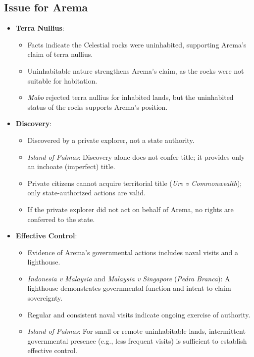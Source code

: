 \subsection{Issue for Arema}
\begin{itemize}
    \item \textbf{Terra Nullius}:
    \begin{itemize}
        \item Facts indicate the Celestial rocks were uninhabited, supporting Arema’s claim of terra nullius.
        \item Uninhabitable nature strengthens Arema’s claim, as the rocks were not suitable for habitation.
        \item \textit{Mabo} rejected terra nullius for inhabited lands, but the uninhabited status of the rocks supports Arema’s position.
    \end{itemize}
    \item \textbf{Discovery}:
    \begin{itemize}
        \item Discovered by a private explorer, not a state authority.
        \item \textit{Island of Palmas}: Discovery alone does not confer title; it provides only an inchoate (imperfect) title.
        \item Private citizens cannot acquire territorial title (\textit{Ure v Commonwealth}); only state-authorized actions are valid.
        \item If the private explorer did not act on behalf of Arema, no rights are conferred to the state.
    \end{itemize}
    \item \textbf{Effective Control}:
    \begin{itemize}
        \item Evidence of Arema’s governmental actions includes naval visits and a lighthouse.
        \item \textit{Indonesia v Malaysia} and \textit{Malaysia v Singapore} (\textit{Pedra Branca}): A lighthouse demonstrates governmental function and intent to claim sovereignty.
        \item Regular and consistent naval visits indicate ongoing exercise of authority.
        \item \textit{Island of Palmas}: For small or remote uninhabitable lands, intermittent governmental presence (e.g., less frequent visits) is sufficient to establish effective control.
    \end{itemize}
\end{itemize}

